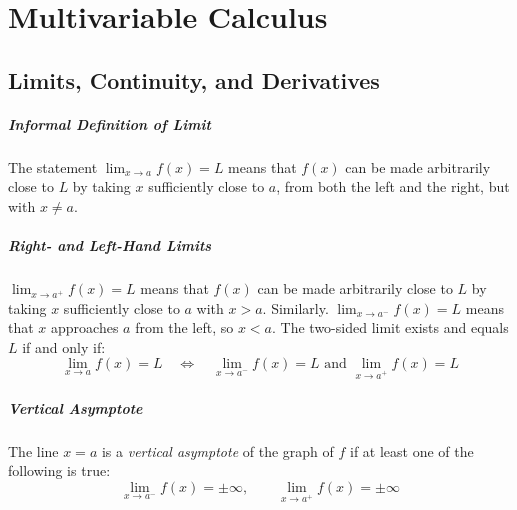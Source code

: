 \documentclass[oneside]{book}
\begin{document}


\chapter{Multivariable Calculus}

\section{Limits, Continuity, and Derivatives}



\paragraph{Informal Definition of Limit} The statement $\lim_{x\to a} f(x)=L$ means that $f(x)$ can be made arbitrarily close to $L$ by taking $x$ sufficiently close to $a$, from both the left and the right, but with $x\ne a$.

\paragraph{Right- and Left-Hand Limits}{
    $\lim_{x\to a^+} f(x)=L$ means that $f(x)$ can be made arbitrarily close to $L$ by taking $x$ sufficiently close to $a$ with $x>a$. Similarly. $\lim_{x\to a^-} f(x)=L$ means that $x$ approaches $a$ from the left, so $x<a$.
    The two-sided limit exists and equals $L$ if and only if:
    \[
        \lim_{x\to a} f(x)=L
        \quad\Longleftrightarrow\quad
        \lim_{x\to a^-} f(x)=L
        \text{ and }
        \lim_{x\to a^+} f(x)=L
    \]
}

\paragraph{Vertical Asymptote}{
    The line $x=a$ is a \emph{vertical asymptote} of the graph of $f$ if at least one of the following is true:
    \[
        \lim_{x\to a^-}f(x)=\pm\infty,
        \qquad
        \lim_{x\to a^+}f(x)=\pm\infty
    \]
}
\end{document}

